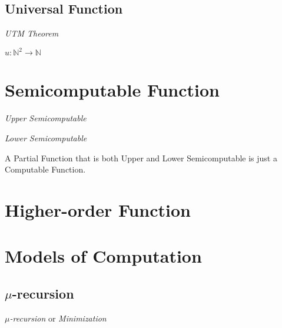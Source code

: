\subsection{Universal Function}\label{sec:universal_function}

\emph{UTM Theorem}

$u : \mathbb{N}^2 \rightarrow \mathbb{N}$



\section{Semicomputable Function}\label{sec:semicomputable_function}

\emph{Upper Semicomputable}

\emph{Lower Semicomputable}

A Partial Function that is both Upper and Lower Semicomputable is just
a Computable Function.



\section{Higher-order Function}\label{sec:higherorder_function}



\section{Models of Computation}\label{sec:computation_model}

\subsection{$\mu$-recursion}\label{sec:mu_recursion}

\emph{$\mu$-recursion} or \emph{Minimization}

